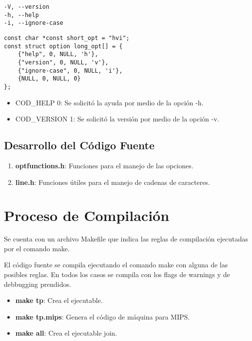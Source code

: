 \documentclass[a4paper, 10pt, twoside, notitlepage]{article}
\begin{document}
\begin{verbatim}
-V, --version
-h, --help
-i, --ignore-case 
\end{verbatim}

\lipsum[3-3]


\begin{verbatim}
const char *const short_opt = "hvi";
const struct option long_opt[] = {
    {"help", 0, NULL, 'h'},
    {"version", 0, NULL, 'v'},
    {"ignore-case", 0, NULL, 'i'},
    {NULL, 0, NULL, 0}
};
\end{verbatim}


\begin{itemize}
 \item COD\_HELP 0: Se solicitó la ayuda por medio de la opción -h.
 \item COD\_VERSION 1: Se solicitó la versión por medio de la opción -v.
\end{itemize}

\newpage
\subsection{Desarrollo del Código Fuente}
\lipsum[3-3]

\begin{enumerate}
 \item \textbf{optfunctions.h}: Funciones para el manejo de las opciones.
 \item \textbf{line.h}: Funciones útiles para el manejo de cadenas de caracteres.
\end{enumerate}

\lipsum[3-3]



\section{Proceso de Compilación}

Se cuenta con un archivo Makefile que indica las reglas de compilación ejecutadas por el comando make.

El código fuente se compila ejecutando el comando make con alguna de las posibles reglas. En todos los casos se compila con los flags de warnings y de debbugging prendidos.

\begin{itemize} 
 \item[] \textbf{make tp}: Crea el ejecutable.
 \item[] \textbf{make tp.mips}: Genera el código de máquina para MIPS.
 \item[] \textbf{make all}: Crea el ejecutable join.
\end{itemize}
\end{document}
